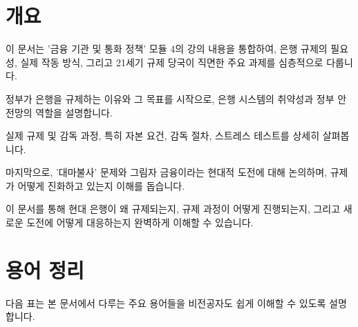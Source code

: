 \documentclass[11pt,a4paper]{article}
\begin{document}
\newpage
\section*{개요}

\begin{summarybox}[title=모듈 4: 규제 개요]
이 문서는 '금융 기관 및 통화 정책' 모듈 4의 강의 내용을 통합하여, 은행 규제의 필요성, 실제 작동 방식, 그리고 21세기 규제 당국이 직면한 주요 과제를 심층적으로 다룹니다.

정부가 은행을 규제하는 이유와 그 목표를 시작으로, 은행 시스템의 취약성과 정부 안전망의 역할을 설명합니다.

실제 규제 및 감독 과정, 특히 자본 요건, 감독 절차, 스트레스 테스트를 상세히 살펴봅니다.

마지막으로, '대마불사' 문제와 그림자 금융이라는 현대적 도전에 대해 논의하며, 규제가 어떻게 진화하고 있는지 이해를 돕습니다.

이 문서를 통해 현대 은행이 왜 규제되는지, 규제 과정이 어떻게 진행되는지, 그리고 새로운 도전에 어떻게 대응하는지 완벽하게 이해할 수 있습니다.
\end{summarybox}

\newpage
\section*{용어 정리}

다음 표는 본 문서에서 다루는 주요 용어들을 비전공자도 쉽게 이해할 수 있도록 설명합니다.
\end{document}
